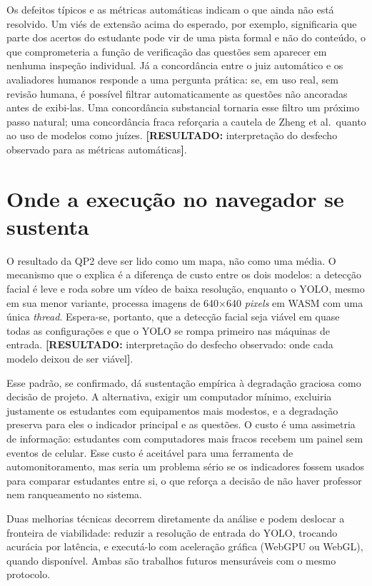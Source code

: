 \documentclass[portuguese,oneside]{tcc}
\newcommand{\estr}[1]{\emph{#1}}
\newcommand{\resultado}[1]{\textcolor{red!70!black}{\textbf{[RESULTADO:} #1\textbf{]}}}
\begin{document}
Os defeitos típicos e as métricas automáticas indicam o que ainda não está resolvido. Um viés de extensão acima do esperado, por exemplo, significaria que parte dos acertos do estudante pode vir de uma pista formal e não do conteúdo, o que comprometeria a função de verificação das questões sem aparecer em nenhuma inspeção individual. Já a concordância entre o juiz automático e os avaliadores humanos responde a uma pergunta prática: se, em uso real, sem revisão humana, é possível filtrar automaticamente as questões não ancoradas antes de exibi-las. Uma concordância substancial tornaria esse filtro um próximo passo natural; uma concordância fraca reforçaria a cautela de Zheng et al.\ quanto ao uso de modelos como juízes. \resultado{interpretação do desfecho observado para as métricas automáticas}.

\section{Onde a execução no navegador se sustenta}

O resultado da QP2 deve ser lido como um mapa, não como uma média. O mecanismo que o explica é a diferença de custo entre os dois modelos: a detecção facial é leve e roda sobre um vídeo de baixa resolução, enquanto o YOLO, mesmo em sua menor variante, processa imagens de 640$\times$640 \estr{pixels} em WASM com uma única \estr{thread}. Espera-se, portanto, que a detecção facial seja viável em quase todas as configurações e que o YOLO se rompa primeiro nas máquinas de entrada. \resultado{interpretação do desfecho observado: onde cada modelo deixou de ser viável}.

Esse padrão, se confirmado, dá sustentação empírica à degradação graciosa como decisão de projeto. A alternativa, exigir um computador mínimo, excluiria justamente os estudantes com equipamentos mais modestos, e a degradação preserva para eles o indicador principal e as questões. O custo é uma assimetria de informação: estudantes com computadores mais fracos recebem um painel sem eventos de celular. Esse custo é aceitável para uma ferramenta de automonitoramento, mas seria um problema sério se os indicadores fossem usados para comparar estudantes entre si, o que reforça a decisão de não haver professor nem ranqueamento no sistema.

Duas melhorias técnicas decorrem diretamente da análise e podem deslocar a fronteira de viabilidade: reduzir a resolução de entrada do YOLO, trocando acurácia por latência, e executá-lo com aceleração gráfica (WebGPU ou WebGL), quando disponível. Ambas são trabalhos futuros mensuráveis com o mesmo protocolo.
\end{document}
